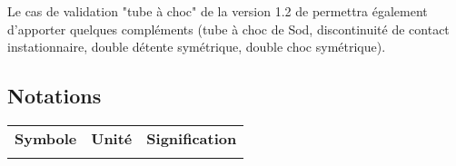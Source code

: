 Le cas de validation "tube à choc" de la version 1.2 de \CS permettra
également d'apporter quelques compléments (tube à choc de Sod,
discontinuité de contact instationnaire, double détente symétrique,
double choc symétrique).

\newpage
\subsection*{Notations}

\begin{table}[h!]
\begin{tabular}{ccp{}}

{\bf Symbole} & {\bf Unité} & {\bf Signification}\\

\phantom{$C_v$, ${C_v}_i$} & \phantom{$\lbrack f\rbrack.\,kg/(m^3.\,s)$} & \\


\end{tabular}
\end{table}
